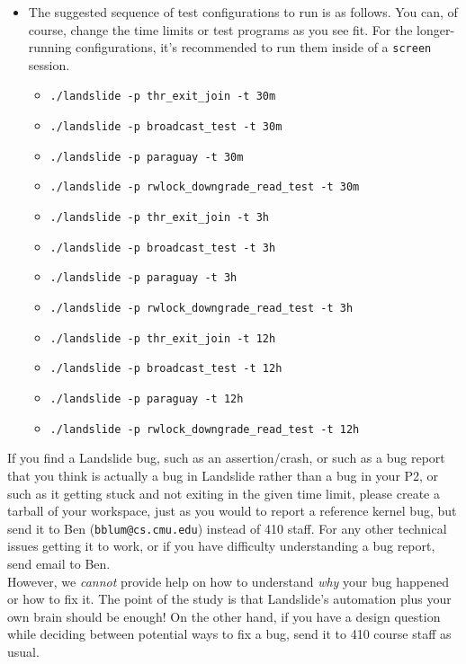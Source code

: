 \documentclass{article}
\begin{document}
\begin{enumerate}
\begin{itemize}
			\item The suggested sequence of test configurations to run is as follows. You can, of course, change the time limits or test programs as you see fit. For the longer-running configurations, it's recommended to run them inside of a {\tt screen} session.
			\begin{itemize}
				\item {\tt ./landslide -p thr\_exit\_join -t 30m}
				\item {\tt ./landslide -p broadcast\_test -t 30m}
				\item {\tt ./landslide -p paraguay -t 30m}
				\item {\tt ./landslide -p rwlock\_downgrade\_read\_test -t 30m}
				\item {\tt ./landslide -p thr\_exit\_join -t 3h}
				\item {\tt ./landslide -p broadcast\_test -t 3h}
				\item {\tt ./landslide -p paraguay -t 3h}
				\item {\tt ./landslide -p rwlock\_downgrade\_read\_test -t 3h}
				\item {\tt ./landslide -p thr\_exit\_join -t 12h}
				\item {\tt ./landslide -p broadcast\_test -t 12h}
				\item {\tt ./landslide -p paraguay -t 12h}
				\item {\tt ./landslide -p rwlock\_downgrade\_read\_test -t 12h}
			\end{itemize}
		\end{itemize}
\end{enumerate}

If you find a Landslide bug, such as an assertion/crash, or such as a bug report that you think is actually a bug in Landslide rather than a bug in your P2, or such as it getting stuck and not exiting in the given time limit, please create a tarball of your workspace, just as you would to report a reference kernel bug, but send it to Ben (\texttt{bblum@cs.cmu.edu}) instead of 410 staff.
For any other technical issues getting it to work, or if you have difficulty understanding a bug report, send email to Ben.
\\

\noindent
However, we {\em cannot} provide help on how to understand {\em why} your bug happened or how to fix it. The point of the study is that Landslide's automation plus your own brain should be enough! On the other hand, if you have a design question while deciding between potential ways to fix a bug, send it to 410 course staff as usual.
\end{document}
